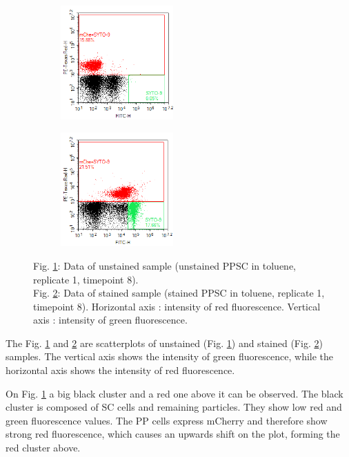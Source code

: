\documentclass[a4paper, 10pt, conference]{ieeeconf}   %
\begin{document}
\begin{figure}
		\hspace{-0.3cm}
		\begin{subfigure}{.25\textwidth}
			\centering			
			\includegraphics[width=4.3cm]{t8_unstained_ppsc1.png}
			\caption{}
			\label{scatter1}			
		\end{subfigure}%
		\begin{subfigure}{.22\textwidth}		
			\centering			
			\includegraphics[width=4.3cm]{t8_stained_ppsc1.png}
			\caption{}
			\label{scatter2}			
		\end{subfigure}
		\caption*{Fig. \ref{scatter1}: Data of unstained sample (unstained PPSC in toluene, replicate 1, timepoint 8). \\ Fig. \ref{scatter2}: Data of stained sample (stained PPSC in toluene, replicate 1, timepoint 8). Horizontal axis : intensity of red fluorescence. Vertical axis : intensity of green fluorescence.}
		\label{scatterplot}
		\vspace{-0.5cm}
\end{figure}

The Fig. \ref{scatter1} and \ref{scatter2} are scatterplots of unstained (Fig. \ref{scatter1}) and stained (Fig. \ref{scatter2}) samples. The vertical axis shows the intensity of green fluorescence, while the horizontal axis shows the intensity of red fluorescence. 



On Fig. \ref{scatter1} a big black cluster and a red one above it can be observed. The black cluster is composed of SC cells and remaining particles. They show  low red and green fluorescence values. The PP cells express mCherry and therefore show strong red fluorescence, which causes an upwards shift on the plot, forming the red cluster above.
\end{document}
